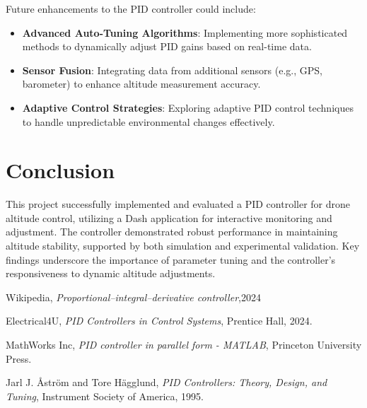 \documentclass[a4paper,12pt]{article}
\begin{document}
Future enhancements to the PID controller could include:

\begin{itemize}
    \item \textbf{Advanced Auto-Tuning Algorithms}: Implementing more sophisticated methods to dynamically adjust PID gains based on real-time data.
    \item \textbf{Sensor Fusion}: Integrating data from additional sensors (e.g., GPS, barometer) to enhance altitude measurement accuracy.
    \item \textbf{Adaptive Control Strategies}: Exploring adaptive PID control techniques to handle unpredictable environmental changes effectively.
\end{itemize}

\section{Conclusion}

This project successfully implemented and evaluated a PID controller for drone altitude control, utilizing a Dash application for interactive monitoring and adjustment. The controller demonstrated robust performance in maintaining altitude stability, supported by both simulation and experimental validation. Key findings underscore the importance of parameter tuning and the controller's responsiveness to dynamic altitude adjustments.

\begin{thebibliography}{9}

  Wikipedia,
  \textit{ Proportional–integral–derivative controller},2024

  Electrical4U,
  \textit{PID Controllers in Control Systems},
  Prentice Hall,
  2024.

  MathWorks Inc,
  \textit{PID controller in parallel form - MATLAB},
  Princeton University Press.

  Jarl J. Åström and Tore Hägglund,
  \textit{PID Controllers: Theory, Design, and Tuning},
  Instrument Society of America, 1995.

\end{thebibliography}
\end{document}
